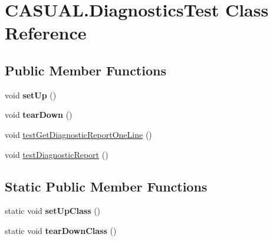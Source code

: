 \hypertarget{class_c_a_s_u_a_l_1_1_diagnostics_test}{\section{C\-A\-S\-U\-A\-L.\-Diagnostics\-Test Class Reference}
\label{class_c_a_s_u_a_l_1_1_diagnostics_test}
}
\subsection*{Public Member Functions}
\begin{DoxyCompactItemize}
\item 
\hypertarget{class_c_a_s_u_a_l_1_1_diagnostics_test_a7fa0c8194b5bf17f782778d81b20f520}{void {\bfseries set\-Up} ()}\label{class_c_a_s_u_a_l_1_1_diagnostics_test_a7fa0c8194b5bf17f782778d81b20f520}

\item 
\hypertarget{class_c_a_s_u_a_l_1_1_diagnostics_test_a86bf70e3d33ad51d710a5b20fdfb4179}{void {\bfseries tear\-Down} ()}\label{class_c_a_s_u_a_l_1_1_diagnostics_test_a86bf70e3d33ad51d710a5b20fdfb4179}

\item 
void \hyperlink{class_c_a_s_u_a_l_1_1_diagnostics_test_a1a46aa52f8482e2f5015df237e7951a5}{test\-Get\-Diagnostic\-Report\-One\-Line} ()
\item 
void \hyperlink{class_c_a_s_u_a_l_1_1_diagnostics_test_aa08b9c865600bfbd7553c60f514b4066}{test\-Diagnostic\-Report} ()
\end{DoxyCompactItemize}
\subsection*{Static Public Member Functions}
\begin{DoxyCompactItemize}
\item 
\hypertarget{class_c_a_s_u_a_l_1_1_diagnostics_test_a542c03fcd0fe74e7addce4a33e8bf073}{static void {\bfseries set\-Up\-Class} ()}\label{class_c_a_s_u_a_l_1_1_diagnostics_test_a542c03fcd0fe74e7addce4a33e8bf073}

\item 
\hypertarget{class_c_a_s_u_a_l_1_1_diagnostics_test_ae4aabad47231d406f082196a4c07c443}{static void {\bfseries tear\-Down\-Class} ()}\label{class_c_a_s_u_a_l_1_1_diagnostics_test_ae4aabad47231d406f082196a4c07c443}

\end{DoxyCompactItemize}


